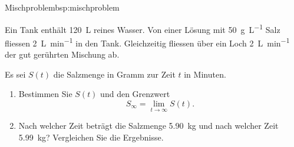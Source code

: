 \begin{bsp}{Mischproblem}{bsp:mischproblem}

    Ein Tank enthält \qty{120}{\liter} reines Wasser.
    Von einer Lösung mit \qty{50}{\gram\per\liter} Salz
    fliessen \qty{2}{\liter\per\minute} in den Tank.
    Gleichzeitig fliessen über ein Loch
    \qty{2}{\liter\per\minute} der gut gerührten
    Mischung ab.

    Es sei \(S(t)\) die Salzmenge in Gramm zur Zeit
    \(t\) in Minuten.

    \begin{enumerate}[label=\alph*)]
        \item Bestimmen Sie \(S(t)\) und den Grenzwert
              \[
                  S_\infty=\lim_{t\to\infty}S(t).
              \]
        \item Nach welcher Zeit beträgt die Salzmenge
              \qty{5.90}{\kilogram} und nach welcher Zeit
              \qty{5.99}{\kilogram}?
              Vergleichen Sie die Ergebnisse.
    \end{enumerate}
    \pagebreak
\end{bsp}
\clearpage
